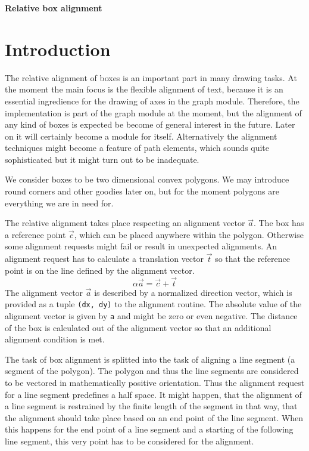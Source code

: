 \documentclass{article}
\begin{document}
\noindent\textbf{\huge Relative box alignment}\medskip
\section{Introduction}
The relative alignment of boxes is an important part in many drawing
tasks. At the moment the main focus is the flexible alignment of text,
because it is an essential ingredience for the drawing of axes in the
graph module. Therefore, the implementation is part of the graph
module at the moment, but the alignment of any kind of boxes is
expected be become of general interest in the future. Later on it will
certainly become a module for itself. Alternatively the alignment
techniques might become a feature of path elements, which sounds quite
sophisticated but it might turn out to be inadequate.

We consider boxes to be two dimensional convex polygons. We may
introduce round corners and other goodies later on, but for the moment
polygons are everything we are in need for.

The relative alignment takes place respecting an alignment vector
$\vec a$. The box has a reference point $\vec c$, which can be placed
anywhere within the polygon. Otherwise some alignment requests might
fail or result in unexpected alignments. An alignment request has to
calculate a translation vector $\vec t$ so that the reference point is
on the line defined by the alignment vector.
\begin{equation}
\label{eq:center}
\alpha\vec a=\vec c+\vec t
\end{equation}
The alignment vector $\vec a$ is described by a normalized direction
vector, which is provided as a tuple \verb|(dx, dy)| to the alignment
routine. The absolute value of the alignment vector is given by
\verb|a| and might be zero or even negative. The distance of the box
is calculated out of the alignment vector so that an additional
alignment condition is met.

The task of box alignment is splitted into the task of aligning a line
segment (a segment of the polygon). The polygon and thus the line
segments are considered to be vectored in mathematically positive
orientation. Thus the alignment request for a line segment predefines
a half space. It might happen, that the alignment of a line segment
is restrained by the finite length of the segment in that way, that
the alignment should take place based on an end point of the line
segment. When this happens for the end point of a line segment and a
starting of the following line segment, this very point has to be
considered for the alignment.
\end{document}
